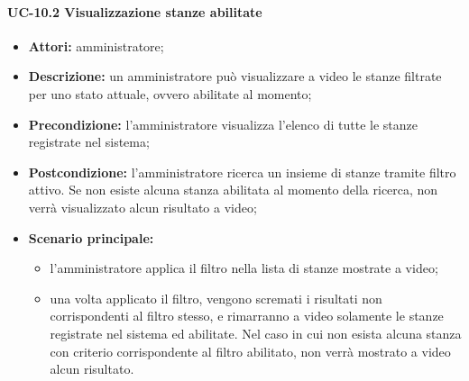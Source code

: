 \paragraph{UC-10.2 Visualizzazione stanze abilitate}
\begin{itemize}
    \item \textbf{Attori:} amministratore;
    \item \textbf{Descrizione:} un amministratore pu\`{o} visualizzare a video le stanze filtrate per uno stato attuale, ovvero abilitate al momento;
    \item \textbf{Precondizione:} l'amministratore visualizza l'elenco di tutte le stanze registrate nel sistema;
    \item \textbf{Postcondizione:} l'amministratore ricerca un insieme di stanze tramite filtro attivo. Se non esiste alcuna stanza abilitata al momento della ricerca, non verrà visualizzato alcun risultato a video;
    \item \textbf{Scenario principale:}
    \begin{itemize}
        \item l'amministratore applica il filtro nella lista di stanze mostrate a video;
        \item una volta applicato il filtro, vengono scremati i risultati non corrispondenti al filtro stesso, e rimarranno a video solamente le stanze registrate nel sistema ed abilitate. Nel caso in cui non esista alcuna stanza con criterio corrispondente al filtro abilitato, non verrà mostrato a video alcun risultato.
    \end{itemize}
\end{itemize}


